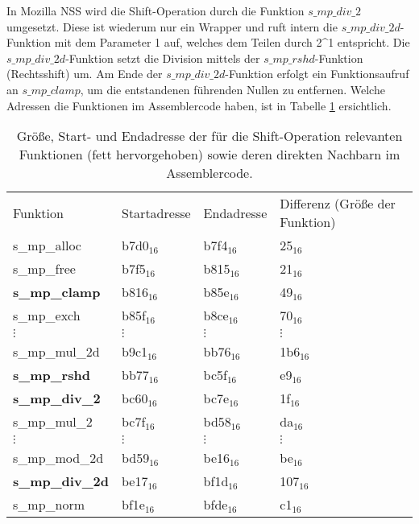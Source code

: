 In Mozilla NSS wird die Shift-Operation durch die Funktion $s\_mp\_div\_2$ umgesetzt.
Diese ist wiederum nur ein Wrapper und ruft intern die $s\_mp\_div\_2d$-Funktion mit dem Parameter 1 auf, welches dem Teilen durch 2^1 entspricht.
Die $s\_mp\_div\_2d$-Funktion setzt die Division mittels der $s\_mp\_rshd$-Funktion (Rechtsshift) um. 
Am Ende der $s\_mp\_div\_2d$-Funktion erfolgt ein Funktionsaufruf an $s\_mp\_clamp$, um die entstandenen führenden Nullen zu entfernen.
Welche Adressen die Funktionen im Assemblercode haben, ist in Tabelle \ref{tbl:assOffsetShift} ersichtlich. 


\begin{table}[h]
\caption{Größe, Start- und Endadresse der für die Shift-Operation relevanten Funktionen (fett hervorgehoben) sowie deren direkten Nachbarn im Assemblercode.}
\label{tbl:assOffsetShift}
\begin{tabular}{llll}
Funktion       & Startadresse & Endadresse & Differenz (Größe der Funktion) \\[10pt]
s\_mp\_alloc   & b7d0$_{16}$        & b7f4$_{16}$      & 25$_{16}$   \\
s\_mp\_free    & b7f5$_{16}$        & b815$_{16}$      & 21$_{16}$   \\
\textbf{s\_mp\_clamp}   & b816$_{16}$        & b85e$_{16}$      & 49$_{16}$   \\
s\_mp\_exch    & b85f$_{16}$        & b8ce$_{16}$      & 70$_{16}$   \\
$\vdots$               &  $\vdots$             &    $\vdots$         &     $\vdots$   \\
s\_mp\_mul\_2d & b9c1$_{16}$        & bb76$_{16}$      & 1b6$_{16}$   \\
\textbf{s\_mp\_rshd}    & bb77$_{16}$        & bc5f$_{16}$      & e9$_{16}$   \\
\textbf{s\_mp\_div\_2}  & bc60$_{16}$        & bc7e$_{16}$      & 1f$_{16}$   \\
s\_mp\_mul\_2  & bc7f$_{16}$        & bd58$_{16}$      & da$_{16}$   \\
$\vdots$               &  $\vdots$             &    $\vdots$         &     $\vdots$   \\
s\_mp\_mod\_2d & bd59$_{16}$        & be16$_{16}$      & be$_{16}$   \\
\textbf{s\_mp\_div\_2d} & be17$_{16}$        & bf1d$_{16}$      & 107$_{16}$  \\
s\_mp\_norm    & bf1e$_{16}$        & bfde$_{16}$      & c1$_{16}$  
\end{tabular}
\end{table}

